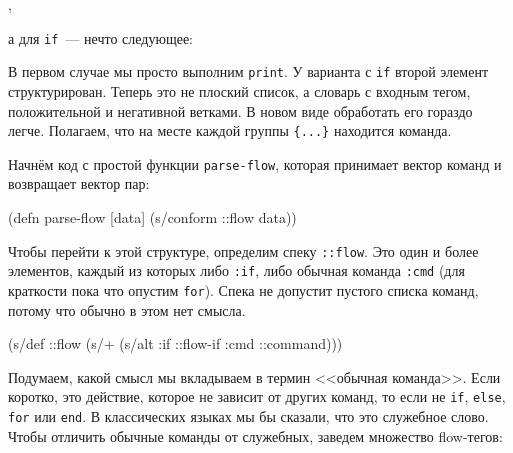 \begin{english}
  \begin{clojure}
,
  \end{clojure}
\end{english}

\noindent
а для \texttt{if}~--- нечто следующее:

\begin{english}
  \begin{clojure}
  \end{clojure}
\end{english}

В первом случае мы просто выполним \verb|print|. У варианта с \verb|if| второй
элемент структурирован. Теперь это не плоский список, а словарь с входным тегом,
положительной и негативной ветками. В новом виде обработать его гораздо
легче. Полагаем, что на месте каждой группы \verb|{...}| находится команда.

Начнём код с простой функции \texttt{parse-flow}, которая принимает вектор
команд и возвращает вектор пар:

\begin{english}
  \begin{clojure}
(defn parse-flow [data]
  (s/conform ::flow data))
  \end{clojure}
\end{english}

Чтобы перейти к этой структуре, определим спеку \texttt{::flow}. Это один и
более элементов, каждый из которых либо \texttt{:if}, либо обычная команда
\texttt{:cmd} (для краткости пока что опустим \texttt{for}). Спека не допустит
пустого списка команд, потому что обычно в этом нет смысла.

\begin{english}
  \begin{clojure}
(s/def ::flow
  (s/+ (s/alt :if ::flow-if
              :cmd ::command)))
  \end{clojure}
\end{english}

Подумаем, какой смысл мы вкладываем в термин <<обычная команда>>. Если коротко,
это действие, которое не зависит от других команд, то если не \texttt{if},
\texttt{else}, \texttt{for} или \texttt{end}. В классических языках мы бы
сказали, что это служебное слово. Чтобы отличить обычные команды от служебных,
заведем множество flow-тегов:

